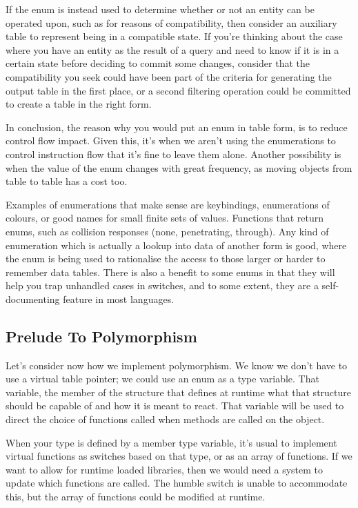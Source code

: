 \documentclass[a4paper,12pt]{article}
\begin{document}
If the enum is instead used to determine whether or not an entity can be operated upon, such as for reasons of compatibility, then consider an auxiliary table to represent being in a compatible state.
If you're thinking about the case where you have an entity as the result of a query and need to know if it is in a certain state before deciding to commit some changes, consider that the compatibility you seek could have been part of the criteria for generating the output table in the first place, or a second filtering operation could be committed to create a table in the right form.

In conclusion, the reason why you would put an enum in table form, is to reduce control flow impact.
Given this, it's when we aren't using the enumerations to control instruction flow that it's fine to leave them alone.
Another possibility is when the value of the enum changes with great frequency, as moving objects from table to table has a cost too.

Examples of enumerations that make sense are keybindings, enumerations of colours, or good names for small finite sets of values.
Functions that return enums, such as collision responses (none, penetrating, through).
Any kind of enumeration which is actually a lookup into data of another form is good, where the enum is being used to rationalise the access to those larger or harder to remember data tables.
There is also a benefit to some enums in that they will help you trap unhandled cases in switches, and to some extent, they are a self-documenting feature in most languages.

\subsection{Prelude To Polymorphism}

Let's consider now how we implement polymorphism.
We know we don't have to use a virtual table pointer;
we could use an enum as a type variable.
That variable, the member of the structure that defines at runtime what that structure should be capable of and how it is meant to react.
That variable will be used to direct the choice of functions called when methods are called on the object.

When your type is defined by a member type variable, it's usual to implement virtual functions as switches based on that type, or as an array of functions.
If we want to allow for runtime loaded libraries, then we would need a system to update which functions are called.
The humble switch is unable to accommodate this, but the array of functions could be modified at runtime.
\end{document}
